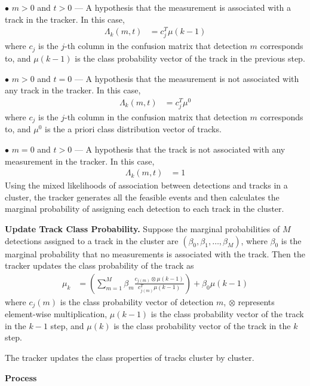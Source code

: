 $\bullet$ $m > 0$ and $t > 0$ — A hypothesis that the measurement is associated with a track in the tracker. 
In this case,
\begin{align}
	\Lambda_{k}(m, t) & = c_{j}^{T} \mu(k-1)
\end{align}
where $c_{j}$ is the $j$-th column in the confusion matrix that detection $m$ corresponds to, and $\mu(k-1)$ is the class probability vector of the track in the previous step.

$\bullet$ $m > 0$ and $t = 0$ — A hypothesis that the measurement is not associated with any track in the tracker. In this case,
\begin{align}
	\Lambda_{k}(m, t) & = c_{j}^{T} \mu^{0}
\end{align}
where $c_{j}$ is the $j$-th column in the confusion matrix that detection $m$ corresponds to, and $\mu^{0}$ is the a priori class distribution vector of tracks.

$\bullet$ $m = 0$ and $t > 0$ — A hypothesis that the track is not associated with any measurement in the tracker. In this case,
\begin{align}
	\Lambda_{k}(m, t) & = 1
\end{align}
Using the mixed likelihoods of association between detections and tracks in a cluster, the tracker generates all the feasible events and then calculates the marginal probability of assigning each detection to each track in the cluster.

\textbf{Update Track Class Probability.}
Suppose the marginal probabilities of $M$ detections assigned to a track in the cluster are $\left(\beta_{0}, \beta_{1}, \ldots, \beta_{M}\right)$, where $\beta_{0}$ is the marginal probability that no measurements is associated with the track. 
Then the tracker updates the class probability of the track as
\begin{align}
	\mu_{k} & = \left(\sum_{m = 1}^{M} \beta_{m} \frac{c_{j(m)} \otimes \mu(k-1)}{c_{j(m)}^{T} \mu(k-1)}\right)+\beta_{0} \mu(k-1)
\end{align}
where $c_{j}(m)$ is the class probability vector of detection $m$, $\otimes$ represents element-wise multiplication, $\mu(k-1)$ is the class probability vector of the track in the $k-1$ step, and $\mu(k)$ is the class probability vector of the track in the $k$ step.

The tracker updates the class properties of tracks cluster by cluster.


\textbf{Process}


